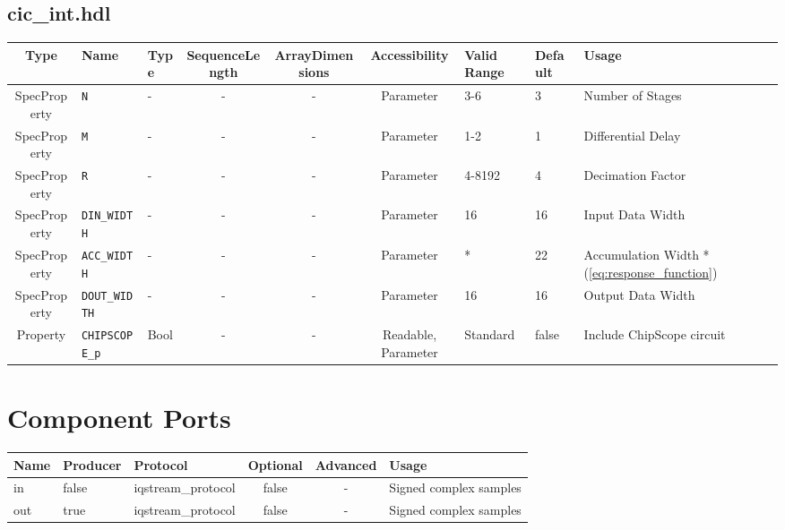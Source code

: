 \documentclass{article}
\def\comp{cic\_int}
\begin{document}
\begin{landscape}
	\subsection*{\comp.hdl}
	\begin{scriptsize}
		\begin{tabular}{|c|p{2cm}|p{1cm}|c|c|c|p{2cm}|p{1cm}|p{5cm}|}
			\hline
			\rowcolor{blue}
			Type         & Name              & Type & SequenceLength & ArrayDimensions & Accessibility & Valid Range & Default & Usage                                            \\
			\hline
			SpecProperty & \verb+N+          & -    & -              & -               & Parameter     & 3-6         & 3       & Number of Stages                                 \\
			\hline
			SpecProperty & \verb+M+          & -    & -              & -               & Parameter     & 1-2         & 1       & Differential Delay                               \\
			\hline
			SpecProperty & \verb+R+          & -    & -              & -               & Parameter     & 4-8192      & 4       & Decimation Factor                                \\
			\hline
			SpecProperty & \verb+DIN_WIDTH+  & -    & -              & -               & Parameter     & 16          & 16      & Input Data Width                                 \\
			\hline
			SpecProperty & \verb+ACC_WIDTH+  & -    & -              & -               & Parameter     & *           & 22      & Accumulation Width *(\ref{eq:response_function}) \\
			\hline
			SpecProperty & \verb+DOUT_WIDTH+  & -    & -              & -               & Parameter           & 16          & 16      & Output Data Width                                \\
			\hline
			Property     & \verb+CHIPSCOPE_p+ & Bool & -              & -               & Readable, Parameter & Standard    & false   & Include ChipScope circuit                        \\
			\hline
		\end{tabular}
	\end{scriptsize}

	\section*{Component Ports}
	\begin{scriptsize}
		\begin{tabular}{|M{2cm}|M{1.5cm}|M{4cm}|c|c|M{9cm}|}
			\hline
			\rowcolor{blue}
			Name & Producer & Protocol           & Optional & Advanced & Usage                  \\
			\hline
			in   & false    & iqstream\_protocol & false    & -        & Signed complex samples \\
			\hline
			out  & true     & iqstream\_protocol & false    & -        & Signed complex samples \\
			\hline
		\end{tabular}
	\end{scriptsize}

\end{landscape}
\end{document}

